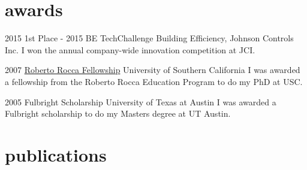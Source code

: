 \documentclass[]{friggeri-cv} %
\begin{document}
\section{awards}

\begin{entrylist}


\entry
{2015}
{1st Place - 2015 BE TechChallenge}
{Building Efficiency, Johnson Controls Inc.}
{I won the annual company-wide innovation competition at JCI.}

\entry
{2007}
{\href{http://www.robertorocca.org/en/fellowships/fellows07.aspx}{Roberto Rocca Fellowship}}
{University of Southern California}
{I was awarded a fellowship from the Roberto Rocca Education Program to do my PhD at USC.}

\entry
{2005}
{Fulbright Scholarship}
{University of Texas at Austin}
{I was awarded a Fulbright scholarship to do my Masters degree at UT Austin.}


\end{entrylist}





\section{publications}


\end{document}
